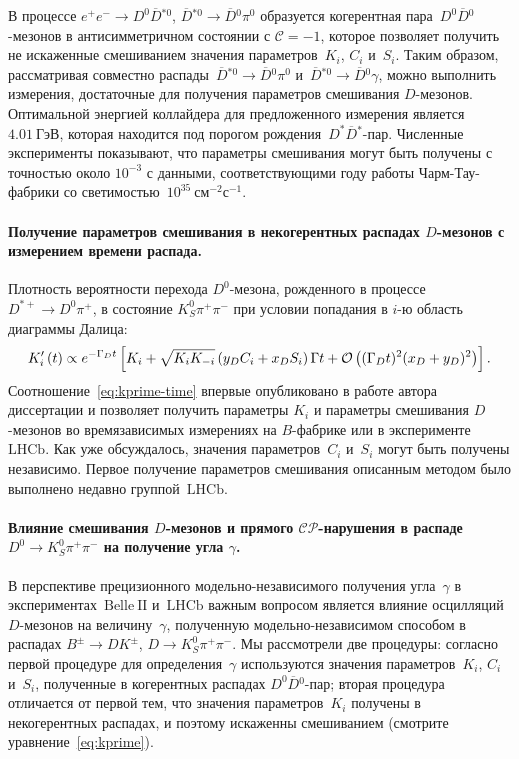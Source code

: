 \documentclass[a4paper,14pt]{extarticle} %
\newcommand{\dn}{\ensuremath{D^0}\xspace}
\newcommand{\dbar}{\ensuremath{\overline{D}}\xspace}
\newcommand{\dnbar}{\ensuremath{\dbar{}^0}\xspace}
\newcommand{\dstp}{\ensuremath{D^{*+}}\xspace}
\newcommand{\ks}{\ensuremath{K_S^0}\xspace}
\newcommand{\pin}{\ensuremath{\pi^0}\xspace}
\newcommand{\gphi}{\ensuremath{\gamma}\xspace}
\newcommand{\gamdt}{\ensuremath{\Gamma_Dt}\xspace}
\newcommand{\oxdydtsq}{\ensuremath{\mco\left((\gamdt)^2(x_D+y_D)^2\right)}\xspace}
\newcommand{\lbr}{\ensuremath{\left(}}
\newcommand{\rbr}{\ensuremath{\right)}}
\newcommand{\bdk}{\ensuremath{B^{\pm}\to D K^{\pm}}\xspace}
\newcommand{\kspp}{\ensuremath{\ks\pi^+\pi^-}\xspace}
\newcommand{\dkpp}{\ensuremath{D\to\ks\pi^+\pi^-}\xspace}
\newcommand{\dnkpp}{\ensuremath{\dn\to\ks\pi^+\pi^-}\xspace}
\newcommand{\dstpdpip}{\ensuremath{\dstp\to\dn\pi^+}\xspace}
\newcommand{\ep}{\ensuremath{e^+e^-}\xspace}
\newcommand{\mco}{\ensuremath{\mathcal{O}}\xspace}
\newcommand{\cpconj}{\ensuremath{\mathcal{CP}}\xspace}
\newcommand{\cconj}{\ensuremath{\mathcal{C}}\xspace}
\newcommand{\gev}{\ensuremath{~\textrm{ГэВ}}\xspace}
\newcommand{\lumi}{\ensuremath{~\textrm{см}^{-2}\textrm{с}^{-1}}\xspace}
\newcommand{\ki}{\ensuremath{K_i}\xspace}
\newcommand{\kmi}{\ensuremath{K_{-i}}\xspace}
\newcommand{\ci}{\ensuremath{C_i}\xspace}
\newcommand{\si}{\ensuremath{S_i}\xspace}
\newcommand{\dexp}{\ensuremath{e^{-\Gamma_D t}}\xspace}
\newcommand{\belle}{\ensuremath{\mathrm{Belle}}\xspace}
\newcommand{\belleii}{\ensuremath{\belle\:\mathrm{II}}\xspace}
\newcommand{\lhcb}{\ensuremath{\mathrm{LHCb}}\xspace}
\begin{document}
В процессе $\ep\to \dn\dbar{}^{*0}$, $\dbar{}^{*0}\to\dnbar\pin$ образуется когерентная пара~$\dn\dnbar$-мезонов в антисимметричном состоянии с $\cconj=-1$, которое позволяет получить не искаженные смешиванием значения параметров~\ki, \ci и~\si.  Таким образом, рассматривая совместно распады~$\dbar{}^{*0}\to\dnbar\pin$ и~$\dbar{}^{*0}\to\dnbar\gamma$, можно выполнить измерения, достаточные для получения параметров смешивания $D$-мезонов.  Оптимальной энергией коллайдера для предложенного измерения является~$4.01\gev$, которая находится под порогом рождения~$D^*\dbar{}^*$-пар.  Численные эксперименты показывают, что параметры смешивания могут быть получены с точностью около $10^{-3}$ с данными, соответствующими году работы Чарм-Тау-фабрики со светимостью~$10^{35}\lumi$.

\paragraph{\boldmath Получение параметров смешивания в некогерентных распадах $D$-мезонов с измерением времени распада. } Плотность вероятности перехода \dn-мезона, рожденного в процессе \dstpdpip, в состояние \kspp при условии попадания в $i$-ю область диаграммы Далица:
\begin{equation}\label{eq:kprime-time}
 \ki^{\prime}\lbr t\rbr \propto \dexp\left[ \ki+\sqrt{\ki\kmi}\lbr y_D\ci+x_D\si\rbr\Gamma t+ \oxdydtsq \right].
\end{equation}
Соотношение~\eqref{eq:kprime-time} впервые опубликовано в работе автора диссертации и позволяет получить параметры \ki и параметры смешивания $D$-мезонов во времязависимых измерениях на $B$-фабрике или в эксперименте~\lhcb.  Как уже обсуждалось, значения параметров~\ci и~\si могут быть получены независимо.  Первое получение параметров смешивания описанным методом было выполнено недавно группой~\lhcb. 

\paragraph{\boldmath Влияние смешивания $D$-мезонов и прямого \cpconj-нарушения в распаде \dnkpp на получение угла \gphi. } В перспективе прецизионного модельно-независимого получения угла~\gphi в экспериментах~\belleii и~\lhcb важным вопросом является влияние осцилляций $D$-мезонов на величину~\gphi, полученную модельно-независимом способом в распадах \bdk, \dkpp.  Мы рассмотрели две процедуры: согласно первой процедуре для определения~\gphi используются значения параметров~\ki, \ci и~\si, полученные в когерентных распадах $\dn\dnbar$-пар; вторая процедура отличается от первой тем, что значения параметров~\ki получены в некогерентных распадах, и поэтому искаженны смешиванием (смотрите уравнение~\eqref{eq:kprime}).  
\end{document}
